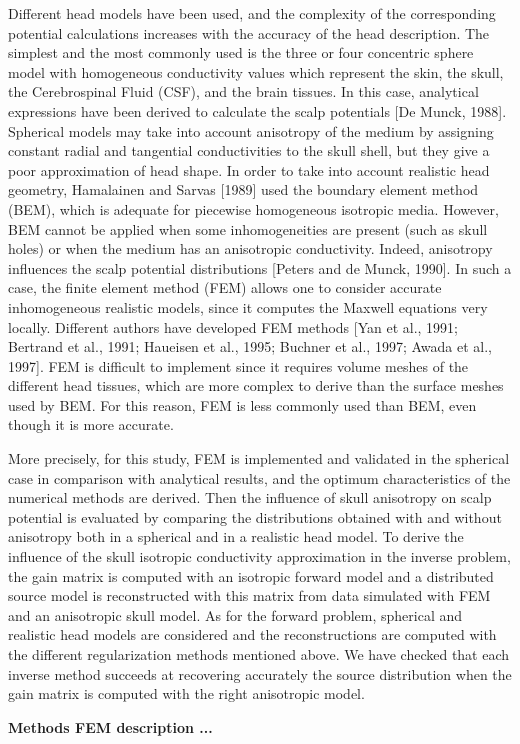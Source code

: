 {Different head models have been used, and the complexity of the corresponding potential calculations increases with the accuracy of the head description. The simplest and the most commonly used is the three or four concentric sphere model with homogeneous conductivity values which represent the skin, the skull, the Cerebrospinal Fluid (CSF), and the brain tissues. In this case, analytical expressions have been derived to calculate the scalp potentials [De Munck, 1988]. Spherical models may take into account anisotropy of the medium by assigning constant radial and tangential conductivities to the skull shell, but they give a poor approximation of head shape. In order to take into account realistic head geometry, Hamalainen and Sarvas [1989] used the boundary element method (BEM), which is adequate for piecewise homogeneous isotropic media. However, BEM cannot be applied when some inhomogeneities are present (such as skull holes) or when the medium has an anisotropic conductivity. Indeed, anisotropy influences the scalp potential distributions [Peters and de Munck, 1990]. In such a case, the finite element method (FEM) allows one to consider accurate inhomogeneous realistic models, since it computes the Maxwell equations very locally. Different authors have developed FEM methods [Yan et al., 1991; Bertrand et al., 1991; Haueisen et al., 1995; Buchner et al., 1997; Awada et al., 1997]. FEM is difficult to implement since it requires volume meshes of the different head tissues, which are more complex to derive than the surface meshes used by BEM. For this reason, FEM is less commonly used than BEM, even though it is more accurate.


More precisely, for this study, FEM is implemented and validated in the spherical case in comparison with analytical results, and the optimum characteristics of the numerical methods are derived. Then the influence of skull anisotropy on scalp potential is evaluated by comparing the distributions obtained with and without anisotropy both in a spherical and in a realistic head model. To derive the influence of the skull isotropic conductivity approximation in the inverse problem, the gain matrix is computed with an isotropic forward model and a distributed source model is reconstructed with this matrix from data simulated with FEM and an anisotropic skull model. As for the forward problem, spherical and realistic head models are considered and the reconstructions are computed with the different regularization methods mentioned above. We have checked that each inverse method succeeds at recovering accurately the source distribution when the gain matrix is computed with the right anisotropic model.

{\bf Methods FEM description ...}


}

